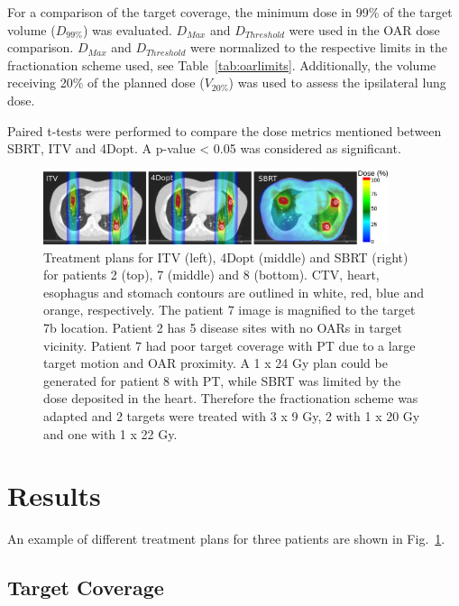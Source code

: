 For a comparison of the target coverage, the minimum dose in 99\% of the target volume ($D_{99\%}$) was evaluated. $D_{Max}$ and $D_{Threshold}$ were used in the OAR dose comparison. $D_{Max}$ and $D_{Threshold}$ were normalized to the respective limits
in the fractionation scheme used, see Table~\ref{tab:oarlimits}. Additionally, the volume receiving 20\% of the planned dose ($V_{20\%}$) was used to assess the ipsilateral lung dose.

Paired t-tests were performed to compare the dose metrics mentioned between SBRT, ITV and 4Dopt. A p-value < 0.05 was considered as significant. 


\newpage
\begin{figure}[H]
	\begin{center}
		\includegraphics[width=0.9\textwidth]{./ComplexPatients/Images/multiExample.png}
		\caption{Treatment plans for ITV (left), 4Dopt (middle) and SBRT (right) for patients 2 (top), 7 (middle) and 8 (bottom). 
		CTV, heart, esophagus and stomach contours are outlined in white, red, blue and orange,
		respectively. The patient 7 image is magnified to the target 7b location. Patient 2 has 5 disease sites with no OARs in target vicinity. Patient 7 had poor target coverage
		with PT due to a large target motion and OAR proximity. A 1 x 24 Gy plan could be generated for patient 8 with PT, 
		while SBRT was limited by the dose deposited in the heart. Therefore the fractionation scheme was adapted and 2 targets were treated with 3 x 9 Gy, 2 with 1 x 20 Gy and one with 1 x 22 Gy. }
		\label{Fig:multiExample}
	\end{center}
\end{figure}
\newpage


\section{Results}

An example of different treatment plans for three patients are shown in Fig.~\ref{Fig:multiExample}. 

\subsection{Target Coverage}

